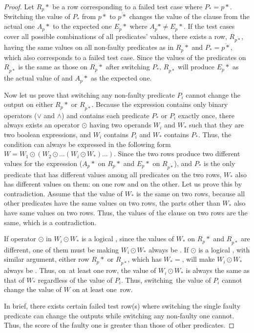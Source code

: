 \begin{proof}
Let $R_p*$ be a row corresponding to a failed test case where
$P_*=p*$.  Switching the value of $P_*$ from $p*$ to $\overline{p*}$
changes the value of the  clause from the actual one
$A_p*$ to the expected one $E_p*$ where $A_p* \neq E_p*$. If the test
cases cover all possible combinations of all predicates' values, there
exists a row, $R_{\overline{p*}}$, having the same values on all
non-faulty predicates as in $R_p*$ and $P_*=\overline{p*}$, which also
corresponds to a failed test case. Since the values of the predicates
on $R_{\overline{p*}}$ is the same as those on $R_p*$ after switching
$P_*$, $R_{\overline{p*}}$ will produce $E_p*$ as the actual value of
 and $A_p*$ as the expected one. 

Now let us prove that switching any non-faulty predicate $P_i$ cannot
change the output on either $R_p*$ or $R_{\overline{p*}}$. Because the
 expression contains only binary operators ($\vee$ and
$\wedge$) and contains each predicate $P_*$ or $P_i$ exactly once,
there always exists an operator $\odot$ having two operands $W_i$ and
$W_*$ such that they are two boolean expressions, and $W_i$ contains
$P_i$ and $W_*$ contains $P_*$.  Thus, the
 condition can always be expressed in the following form
$W = W_1 \odot (W_2 \odot \dots (W_i \odot W_*)\dots)$.  Since the two
rows produce two different values for the  expression
($A_p*$ on $R_p*$ and $E_p*$ on $R_{\overline{p*}}$), and $P_*$ is the
only predicate that has different values among all predicates on the
two rows, $W_*$ also has different values on them:  on one
row and  on the other. Let us prove this by
contradiction. Assume that the value of $W_*$ is the same on two rows,
because all other predicates have the same values on two rows, the
parts other than $W_*$ also have same values on two rows. Thus, the
values of the  clause on two rows are the same, which is
a contradiction.

If operator $\odot$ in $W_i \odot W_*$ is a logical , since the
values of $W_*$ on $R_p*$ and $R_{\overline{p*}}$ are different, one
of them must be  making $W_i \odot W_*$ always be
. If $\odot$ is a logical , with similar argument, either
row $R_p*$ or $R_{\overline{p*}}$, which has $W_*=$, will
make $W_i \odot W_*$ always be . Thus, on~at least
one row, the value of $W_i \odot W_*$ is always the same as that of
$W_*$ regardless of the value of $P_i$. Thus, switching~the value of
$P_i$ cannot change the value of $W$ on at least one~row.

In brief, there exists certain failed test row(s) where switching
the single faulty predicate can change the outputs while switching any
non-faulty one cannot. Thus, the  score of the
faulty one is greater than those of other predicates.
\end{proof}

